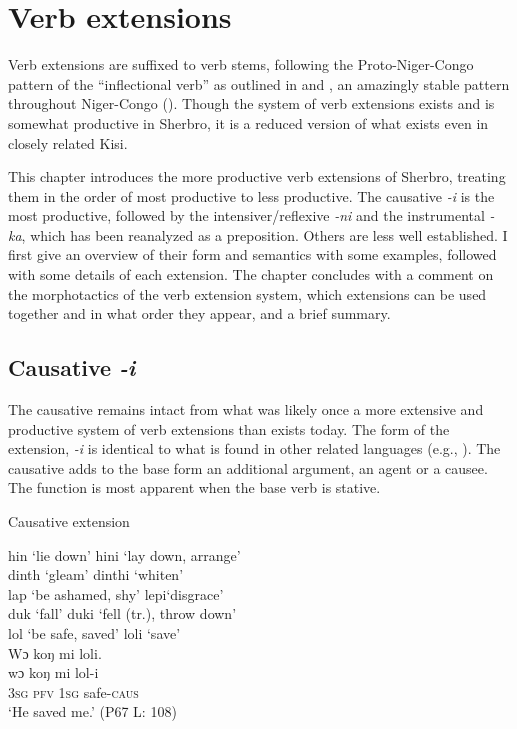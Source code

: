 \chapter{Verb extensions}
\label{ch:6}\hypertarget{Toc115517799}{}
Verb extensions are suffixed to verb stems, following the Proto-Niger-Congo pattern of the “inflectional verb” as outlined in \citet{Nurse2007} and \citet{Nurse2008}, an amazingly stable pattern throughout Niger-Congo (\citealt{Hyman2007}). Though the system of verb extensions exists and is somewhat productive in Sherbro, it is a reduced version of what exists even in closely related Kisi.

This chapter introduces the more productive verb extensions of Sherbro, treating them in the order of most productive to less productive. The causative \textit{{}-i} is the most productive, followed by the intensiver/reflexive \textit{{}-ni} and the instrumental \mbox{\textit{{}-ka}}, which has been reanalyzed as a preposition. Others are less well established. I first give an overview of their form and semantics with some examples, followed with some details of each extension. The chapter concludes with a comment on the morphotactics of the verb extension system, which extensions can be used together and in what order they appear, and a brief summary.

\section{Causative \textit{-i}}
\label{sec:6.1}\hypertarget{Toc115517800}{}
The causative remains intact from what was likely once a more extensive and productive system of verb extensions than exists today. The form of the extension, \textit{{}-i} is identical to what is found in other related languages (e.g., \citealt{Childs1987}). The causative adds to the base form an additional argument, an agent or a causee. The function is most apparent when the base verb is stative.

\TabPositions{1.5cm,5.5cm,7cm,8cm}

\ea%
  \label{ex:158}
  Causative extension

  \ea
  hin \tab ‘lie down' \tab hini \tab ‘lay down, arrange'\\
  dinth \tab ‘gleam' \tab dinthi \tab ‘whiten'\\
  lap \tab ‘be ashamed, shy' \tab lepi\footnotemark \tab ‘disgrace'\\
  duk \tab ‘fall' \tab duki \tab ‘fell (tr.), throw down'\\
  lol \tab ‘be safe, saved' \tab loli \tab ‘save'\\
\vspace{6pt}
  \ex Wɔ koŋ mi loli.\\
  \gll wɔ    koŋ  mi    lol-i\\
  \textsc{3sg}  \textsc{pfv}  \textsc{1sg}  safe-\textsc{caus}\\
  \glt ‘He saved me.' (P67 L: 108)
\z
\z
{}

